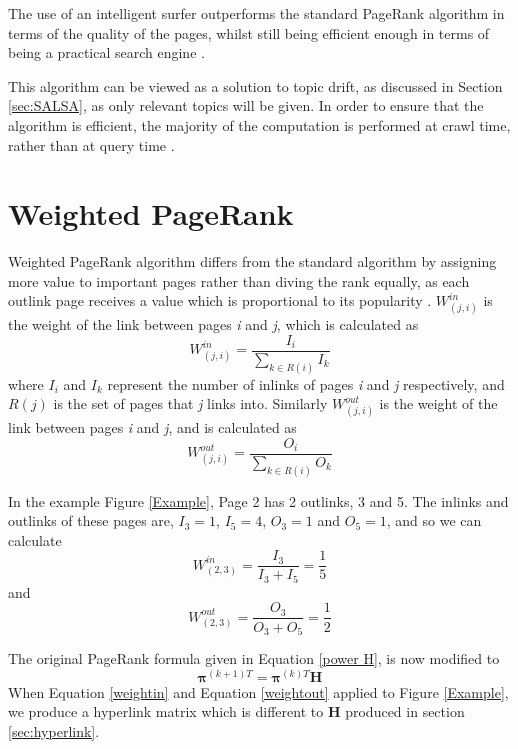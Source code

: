 \documentclass[11pt]{report}
\begin{document}
The use of an intelligent surfer outperforms the standard PageRank algorithm in terms of the quality of the pages, whilst still being efficient enough in terms of being a practical search engine \cite{richardson2002intelligent}. 

This algorithm can be viewed as a solution to topic drift, as discussed in Section \ref{sec:SALSA}, as only relevant topics will be  given. In order to ensure that the algorithm is efficient, the majority of the computation is performed at crawl time, rather than at query time \cite{richardson2002intelligent}. 

\section{Weighted PageRank}\label{sec:weighted}
Weighted PageRank algorithm differs from the standard algorithm by assigning more value to important pages rather than diving the rank equally, as each outlink page receives a value which is proportional to its popularity \cite{xing2004weighted}. $W^{in}_{(j,i)}$ is the weight of the link between pages \textit{i} and \textit{j}, which is calculated as 
\begin{equation}\label{weightin}
W^{in}_{(j,i)} = \frac{I_i}{\sum_{k\in R(i)}I_k}
\end{equation}
where $I_i$ and $I_k$ represent the number of inlinks of pages \textit{i} and \textit{j} respectively, and $R(j)$ is the set of pages that \textit{j} links into. 
Similarly $W^{out}_{(j,i)}$ is the weight of the link between pages \textit{i} and \textit{j}, and is calculated as
\begin{equation}\label{weightout}
W^{out}_{(j,i)} = \frac{O_i}{\sum_{k\in R(i)}O_k}
\end{equation}

In the example Figure \ref{Example}, Page 2 has 2 outlinks, 3 and 5. The inlinks and outlinks of these pages are, $I_3 = 1$, $I_5 = 4$, $O_3 = 1$ and $O_5 = 1$, and so we can calculate 
\[W^{in}_{(2,3)} = \frac{I_3}{I_3 + I_5} = \frac{1}{5} \]
and 
\[W^{out}_{(2,3)} = \frac{O_3}{O_3 + O_5} = \frac{1}{2} \] 

The original PageRank formula given in Equation \eqref{power H}, is now modified to 
\begin{equation} \label{WPR formula}
\boldsymbol\pi^{(k+1)T} = \boldsymbol\pi^{(k)T}\textbf{H}
\end{equation}
When Equation \eqref{weightin} and Equation \eqref{weightout} applied to Figure \ref{Example}, we produce a hyperlink matrix which is different to \textbf{H} produced in section \ref{sec:hyperlink}. 
\end{document}
